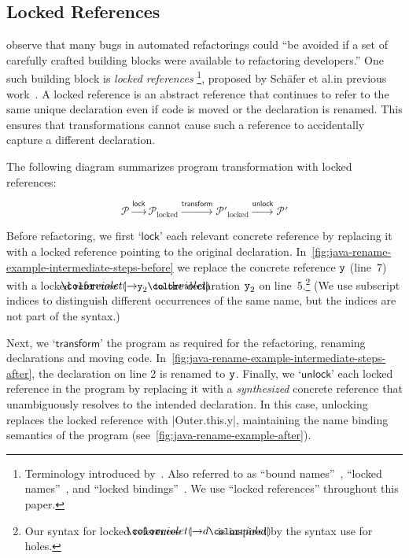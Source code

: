 \subsection{Locked References}%
\label{subsec:language-parametric-locked-references}

 observe that many bugs in automated refactorings could ``be avoided if a set of carefully crafted building blocks were available to refactoring developers.''
One such building block is \emph{locked references}%
\footnote{
  Terminology introduced by~\citet{SchaferTST12}.
  Also referred to as ``bound names''~\citep{ecoop09refactoring}, ``locked names''~\citep{SchaferMOOPSLA2010}, and ``locked bindings''~\citep{SchaferTST12}.
  We use ``locked references'' throughout this paper.
},
proposed by Sch\"afer et al.\@ in previous work~\cite{SchaferEM08,SchaferMOOPSLA2010}.
A locked reference is an abstract reference that continues to refer to the same unique declaration even if code is moved or the declaration is renamed.
This ensures that transformations cannot cause such a reference to accidentally capture a different declaration.

The following diagram summarizes program transformation with locked references:

\[
  \mathcal{P}
  \xrightarrow{\textsf{lock}}
  \mathcal{P}^{}_{\text{locked}}
  \xrightarrow{\textsf{transform}}
  \mathcal{P}'_{\text{locked}}
  \xrightarrow{\textsf{unlock}}
  \mathcal{P}'
\]%
\vspace{0em}

\noindent
Before refactoring, we first `$\mathsf{lock}$' each relevant concrete reference by replacing it with a locked reference pointing to the original declaration.
In~\cref{fig:java-rename-example-intermediate-steps-before} we replace the concrete reference $\texttt{y}$ (line~7) with a locked reference $\rhole[5]{\posid{y}{2}}$ to the declaration $\texttt{y}_{2}$ on line~5.\footnote{
  Our syntax for locked references $\rhole[5]{d}$ is inspired by the syntax \citet{OmarVHAH17} use for holes.
} (We use subscript indices to distinguish different occurrences of the same name, but the indices are not part of the syntax.)

Next, we `$\mathsf{transform}$' the program as required for the refactoring, renaming declarations and moving code.
In~\cref{fig:java-rename-example-intermediate-steps-after}, the declaration on line 2 is renamed to $\texttt{y}$.
Finally, we `$\mathsf{unlock}$' each locked reference in the program by replacing it with a \emph{synthesized} concrete reference that unambiguously resolves to the intended declaration.
In this case, unlocking replaces the locked reference with \inlineJava|Outer.this.y|, maintaining the name binding semantics of the program (see~\cref{fig:java-rename-example-after}).

